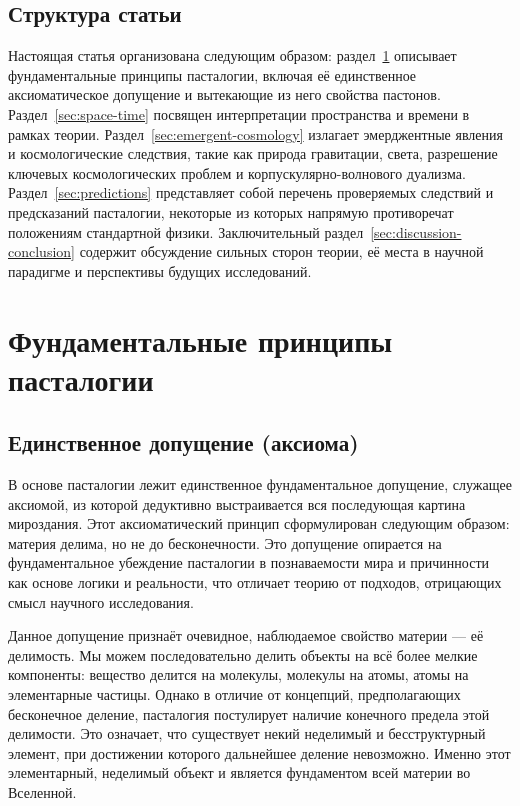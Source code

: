 \documentclass[pdflatex,sn-mathphys-num]{sn-jnl}
\begin{document}
\subsection{Структура статьи}\label{subsec:structure}

Настоящая статья организована следующим образом: раздел~\ref{sec:fundamentals} описывает фундаментальные принципы пасталогии, включая её единственное аксиоматическое допущение и вытекающие из него свойства пастонов. Раздел~\ref{sec:space-time} посвящен интерпретации пространства и времени в рамках теории. Раздел~\ref{sec:emergent-cosmology} излагает эмерджентные явления и космологические следствия, такие как природа гравитации, света, разрешение ключевых космологических проблем и корпускулярно-волнового дуализма. Раздел~\ref{sec:predictions} представляет собой перечень проверяемых следствий и предсказаний пасталогии, некоторые из которых напрямую противоречат положениям стандартной физики. Заключительный раздел~\ref{sec:discussion-conclusion} содержит обсуждение сильных сторон теории, её места в научной парадигме и перспективы будущих исследований.

\section{Фундаментальные принципы пасталогии}\label{sec:fundamentals}

\subsection{Единственное допущение (аксиома)}\label{subsec:axiom}

В основе пасталогии лежит единственное фундаментальное допущение, служащее аксиомой, из которой дедуктивно выстраивается вся последующая картина мироздания. Этот аксиоматический принцип сформулирован следующим образом: материя делима, но не до бесконечности. Это допущение опирается на фундаментальное убеждение пасталогии в познаваемости мира и причинности как основе логики и реальности, что отличает теорию от подходов, отрицающих смысл научного исследования.

Данное допущение признаёт очевидное, наблюдаемое свойство материи --- её делимость. Мы можем последовательно делить объекты на всё более мелкие компоненты: вещество делится на молекулы, молекулы на атомы, атомы на элементарные частицы. Однако в отличие от концепций, предполагающих бесконечное деление, пасталогия постулирует наличие конечного предела этой делимости. Это означает, что существует некий неделимый и бесструктурный элемент, при достижении которого дальнейшее деление невозможно. Именно этот элементарный, неделимый объект и является фундаментом всей материи во Вселенной.
\end{document}
